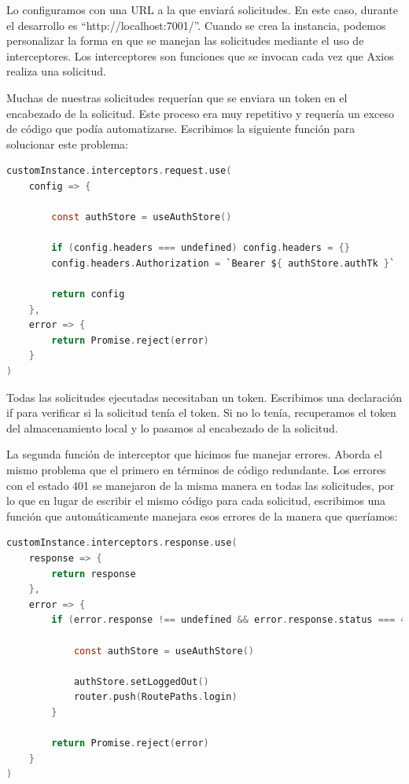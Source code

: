Lo configuramos con una URL a la que enviará solicitudes. En este caso, durante el desarrollo es ``http://localhost:7001/''. Cuando se crea la instancia, podemos personalizar la forma en que se manejan las solicitudes mediante el uso de interceptores. Los interceptores son funciones que se invocan cada vez que Axios realiza una solicitud.

Muchas de nuestras solicitudes requerían que se enviara un token en el encabezado de la solicitud. Este proceso era muy repetitivo y requería un exceso de código que podía automatizarse. Escribimos la siguiente función para solucionar este problema:

\begin{lstlisting}[language=C,caption={Interceptor de solicitudes de Axios}, label={lst:axios2}]
customInstance.interceptors.request.use(
    config => {

        const authStore = useAuthStore()  

        if (config.headers === undefined) config.headers = {}                               
        config.headers.Authorization = `Bearer ${ authStore.authTk }`      // assign store token to axios configuration

        return config
    },
    error => {
        return Promise.reject(error)
    }
)
\end{lstlisting}

Todas las solicitudes ejecutadas necesitaban un token. Escribimos una declaración if para verificar si la solicitud tenía el token. Si no lo tenía, recuperamos el token del almacenamiento local y lo pasamos al encabezado de la solicitud.


La segunda función de interceptor que hicimos fue manejar errores. Aborda el mismo problema que el primero en términos de código redundante. Los errores con el estado 401 se manejaron de la misma manera en todas las solicitudes, por lo que en lugar de escribir el mismo código para cada solicitud, escribimos una función que automáticamente manejara esos errores de la manera que queríamos:

\begin{lstlisting}[language=C,caption={Interceptor de respuestas de Axios}, label={lst:axios2}]
customInstance.interceptors.response.use(
    response => {
        return response
    },
    error => {
        if (error.response !== undefined && error.response.status === 401) {

            const authStore = useAuthStore()

            authStore.setLoggedOut()
            router.push(RoutePaths.login)
        }

        return Promise.reject(error)
    }
)
\end{lstlisting}

